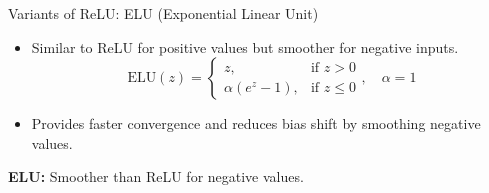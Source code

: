 \documentclass[serif, aspectratio=169]{beamer}
\begin{document}
\begin{frame}{Variants of ReLU: ELU (Exponential Linear Unit)}
    \begin{itemize}
        \item Similar to ReLU for positive values but smoother for negative inputs.
        \begin{equation*}
            \text{ELU}(z) =
            \begin{cases}
                z, & \text{if } z > 0 \\
                \alpha (e^z - 1), & \text{if } z \leq 0
            \end{cases}, \quad \alpha = 1
        \end{equation*}
        \item Provides faster convergence and reduces bias shift by smoothing negative values.
    \end{itemize}
                \begin{center}
            \end{center}
            \vspace{-0.3cm}
            \centering
            \textbf{ELU:} Smoother than ReLU for negative values.
\end{frame}
\end{document}
